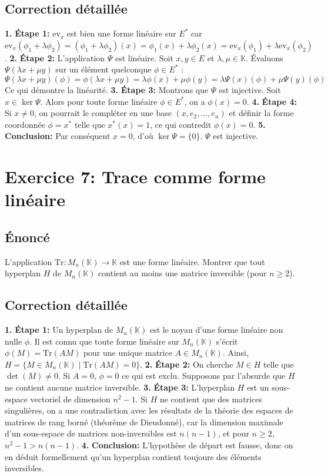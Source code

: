 \documentclass[12pt,a4paper]{report}
\begin{document}
\section{Correction détaillée}
\textbf{1.} \textbf{Étape 1:} $\text{ev}_x$ est bien une forme linéaire sur $E^*$ car $\text{ev}_x(\phi_1 + \lambda \phi_2) = (\phi_1 + \lambda \phi_2)(x) = \phi_1(x) + \lambda \phi_2(x) = \text{ev}_x(\phi_1) + \lambda \text{ev}_x(\phi_2)$.
\textbf{2.} \textbf{Étape 2:} L'application $\Psi$ est linéaire. Soit $x, y \in E$ et $\lambda, \mu \in \mathbb{K}$. Évaluons $\Psi(\lambda x + \mu y)$ sur un élément quelconque $\phi \in E^*$ :
   $$\Psi(\lambda x + \mu y)(\phi) = \phi(\lambda x + \mu y) = \lambda \phi(x) + \mu \phi(y) = \lambda \Psi(x)(\phi) + \mu \Psi(y)(\phi)$$
   Ce qui démontre la linéarité.
\textbf{3.} \textbf{Étape 3:} Montrons que $\Psi$ est injective. Soit $x \in \ker \Psi$. Alors pour toute forme linéaire $\phi \in E^*$, on a $\phi(x) = 0$.
\textbf{4.} \textbf{Étape 4:} Si $x \neq 0$, on pourrait le compléter en une base $(x, e_2, \dots, e_n)$ et définir la forme coordonnée $\phi=x^*$ telle que $x^*(x)=1$, ce qui contredit $\phi(x)=0$.
\textbf{5.} \textbf{Conclusion:} Par conséquent $x=0$, d'où $\ker \Psi = \{0\}$. $\Psi$ est injective.

\newpage
\chapter{Exercice 7: Trace comme forme linéaire}
\section{Énoncé}
L'application $\text{Tr} : M_n(\mathbb{K}) \to \mathbb{K}$ est une forme linéaire. Montrer que tout hyperplan $H$ de $M_n(\mathbb{K})$ contient au moins une matrice inversible (pour $n \ge 2$).

\section{Correction détaillée}
\textbf{1.} \textbf{Étape 1:} Un hyperplan de $M_n(\mathbb{K})$ est le noyau d'une forme linéaire non nulle $\phi$. Il est connu que toute forme linéaire sur $M_n(\mathbb{K})$ s'écrit $\phi(M) = \text{Tr}(AM)$ pour une unique matrice $A \in M_n(\mathbb{K})$. Ainsi, $H = \{ M \in M_n(\mathbb{K}) \mid \text{Tr}(AM) = 0 \}$.
\textbf{2.} \textbf{Étape 2:} On cherche $M \in H$ telle que $\det(M) \neq 0$. Si $A=0$, $\phi=0$ ce qui est exclu. Supposons par l'absurde que $H$ ne contient aucune matrice inversible.
\textbf{3.} \textbf{Étape 3:} L'hyperplan $H$ est un sous-espace vectoriel de dimension $n^2-1$. Si $H$ ne contient que des matrices singulières, on a une contradiction avec les résultats de la théorie des espaces de matrices de rang borné (théorème de Dieudonné), car la dimension maximale d'un sous-espace de matrices non-inversibles est $n(n-1)$, et pour $n \ge 2$, $n^2-1 > n(n-1)$.
\textbf{4.} \textbf{Conclusion:} L'hypothèse de départ est fausse, donc on en déduit formellement qu'un hyperplan contient toujours des éléments inversibles.
\end{document}
